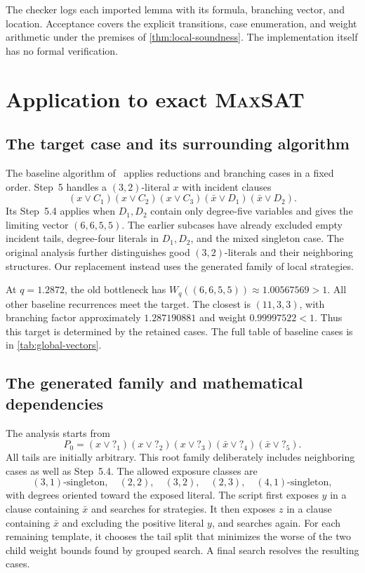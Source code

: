 \documentclass[10pt,twoside]{article}
\newcommand{\MaxSAT}{\textnormal{\textsc{MaxSAT}}}
\newcommand{\tail}[1]{\mathord{?}_{#1}}
\theoremstyle{definition}
\theoremstyle{remark}
\begin{document}
The checker logs each imported lemma with its formula, branching vector,
and location. Acceptance covers the explicit transitions, case enumeration,
and weight arithmetic under the premises of \cref{thm:local-soundness}.
The implementation itself has no formal verification.

\section{Application to exact \MaxSAT{}}
\label{sec:global}

\subsection{The target case and its surrounding algorithm}
\label{sec:bottleneck}

The baseline algorithm of~\cite{Xiao2022}
applies reductions and branching cases in a fixed order. Step~5 handles a
$(3,2)$-literal $x$ with incident clauses
\begin{equation}
 (x\vee C_1)(x\vee C_2)(x\vee C_3)
 (\bar x\vee D_1)(\bar x\vee D_2).
 \label{eq:neighborhood}
\end{equation}
Its Step~5.4 applies when $D_1,D_2$ contain only degree-five variables and
gives the limiting vector $(6,6,5,5)$. The earlier subcases have already
excluded empty incident tails, degree-four literals in $D_1,D_2$, and the
mixed singleton case. The original analysis further distinguishes good
$(3,2)$-literals and their neighboring structures. Our replacement instead
uses the generated family of local strategies.

At $q=1.2872$, the old bottleneck has
$W_q((6,6,5,5))\approx1.00567569>1$. All other baseline recurrences meet
the target. The closest is $(11,3,3)$, with branching factor approximately
$1.287190881$ and weight $0.99997522<1$. Thus this target is determined by
the retained cases. The full table of baseline cases is in
\cref{tab:global-vectors}.

\subsection{The generated family and mathematical dependencies}
\label{sec:configuration}

The analysis starts from
\begin{equation}
 P_0=(x\vee\tail{1})(x\vee\tail{2})(x\vee\tail{3})
     (\bar x\vee\tail{4})(\bar x\vee\tail{5}).
 \label{eq:root}
\end{equation}
All tails are initially arbitrary. This root family deliberately includes
neighboring cases as well as Step~5.4. The allowed exposure classes are
\[
 (3,1)\text{-singleton},\quad (2,2),\quad (3,2),\quad
 (2,3),\quad (4,1)\text{-singleton},
\]
with degrees oriented toward the exposed literal.
The script first exposes $y$ in a clause containing $\bar x$ and searches for
strategies. It then exposes $z$ in a clause containing $\bar x$ and excluding
the positive literal $y$, and searches again. For each remaining template,
it chooses the tail split that minimizes the worse of the two child weight
bounds found by grouped search. A final search resolves the resulting cases.
\end{document}
